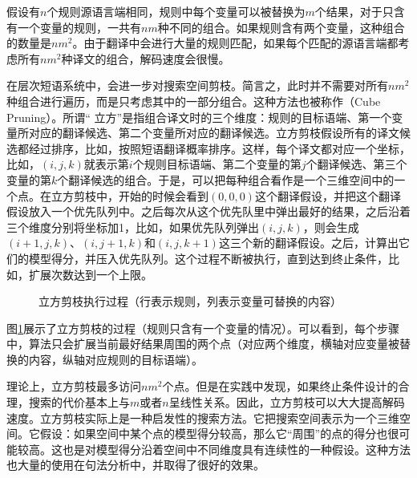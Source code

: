 \parinterval 假设有$n$个规则源语言端相同，规则中每个变量可以被替换为$m$个结果，对于只含有一个变量的规则，一共有$nm$种不同的组合。如果规则含有两个变量，这种组合的数量是$n{m}^2$。由于翻译中会进行大量的规则匹配，如果每个匹配的源语言端都考虑所有$n{m}^2$种译文的组合，解码速度会很慢。

\parinterval 在层次短语系统中，会进一步对搜索空间剪枝。简言之，此时并不需要对所有$n{m}^2$种组合进行遍历，而是只考虑其中的一部分组合。这种方法也被称作{\small{}}（Cube Pruning）。所谓`` 立方''是指组合译文时的三个维度：规则的目标语端、第一个变量所对应的翻译候选、第二个变量所对应的翻译候选。立方剪枝假设所有的译文候选都经过排序，比如，按照短语翻译概率排序。这样，每个译文都对应一个坐标，比如，$(i,j,k)$就表示第$i$个规则目标语端、第二个变量的第$j$个翻译候选、第三个变量的第$k$个翻译候选的组合。于是，可以把每种组合看作是一个三维空间中的一个点。在立方剪枝中，开始的时候会看到$(0,0,0)$这个翻译假设，并把这个翻译假设放入一个优先队列中。之后每次从这个优先队里中弹出最好的结果，之后沿着三个维度分别将坐标加1，比如，如果优先队列弹出$(i,j,k)$，则会生成$(i+1,j,k)$、$(i,j+1,k)$和$(i,j,k+1)$这三个新的翻译假设。之后，计算出它们的模型得分，并压入优先队列。这个过程不断被执行，直到达到终止条件，比如，扩展次数达到一个上限。

\begin{figure}[htp]
\centering

\caption{立方剪枝执行过程（行表示规则，列表示变量可替换的内容）}
\label{fig:4-40}
\end{figure}

\parinterval 图\ref{fig:4-40}展示了立方剪枝的过程（规则只含有一个变量的情况）。可以看到，每个步骤中，算法只会扩展当前最好结果周围的两个点（对应两个维度，横轴对应变量被替换的内容，纵轴对应规则的目标语端）。

\parinterval 理论上，立方剪枝最多访问$n{m}^2$个点。但是在实践中发现，如果终止条件设计的合理，搜索的代价基本上与$m$或者$n$呈线性关系。因此，立方剪枝可以大大提高解码速度。立方剪枝实际上是一种启发性的搜索方法。它把搜索空间表示为一个三维空间。它假设：如果空间中某个点的模型得分较高，那么它``周围''的点的得分也很可能较高。这也是对模型得分沿着空间中不同维度具有连续性的一种假设。这种方法也大量的使用在句法分析中，并取得了很好的效果。


